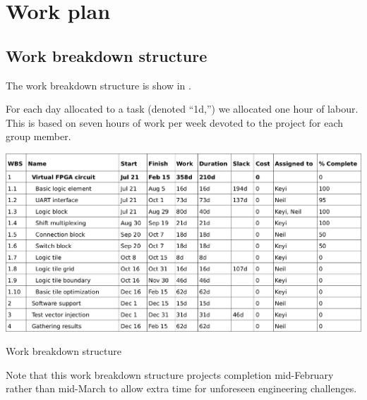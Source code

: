 \section{Work plan}

\subsection{Work breakdown structure} %
\label{wbs}

The work breakdown structure is show in .

For each day allocated to a task (denoted ``1d,'') we allocated one hour of labour.
This is based on seven hours of work per week devoted to the project for each group member.

\begin{table}[!h]
	\centering
	\includegraphics[scale=1.0]{wbs.png}
	\caption{Work breakdown structure}
	\label{work-breakdown}
\end{table}

Note that this work breakdown structure projects completion mid-February rather than mid-March to allow extra time for unforeseen engineering challenges.

